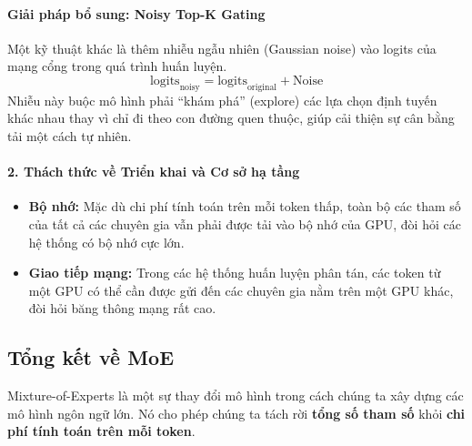 \begin{center}
\label{fig:deepseek_v3_architecture}
\end{center}

\paragraph{Giải pháp bổ sung: Noisy Top-K Gating}
Một kỹ thuật khác là thêm nhiễu ngẫu nhiên (Gaussian noise) vào logits của mạng cổng trong quá trình huấn luyện.
$$ \text{logits}_{\text{noisy}} = \text{logits}_{\text{original}} + \text{Noise} $$
Nhiễu này buộc mô hình phải “khám phá” (explore) các lựa chọn định tuyến khác nhau thay vì chỉ đi theo con đường quen thuộc, giúp cải thiện sự cân bằng tải một cách tự nhiên.

\paragraph{2. Thách thức về Triển khai và Cơ sở hạ tầng}
\begin{itemize}
    \item \textbf{Bộ nhớ:} Mặc dù chi phí tính toán trên mỗi token thấp, toàn bộ các tham số của tất cả các chuyên gia vẫn phải được tải vào bộ nhớ của GPU, đòi hỏi các hệ thống có bộ nhớ cực lớn.
    \item \textbf{Giao tiếp mạng:} Trong các hệ thống huấn luyện phân tán, các token từ một GPU có thể cần được gửi đến các chuyên gia nằm trên một GPU khác, đòi hỏi băng thông mạng rất cao.
\end{itemize}

\subsection{Tổng kết về MoE}
Mixture-of-Experts là một sự thay đổi mô hình trong cách chúng ta xây dựng các mô hình ngôn ngữ lớn. Nó cho phép chúng ta tách rời \textbf{tổng số tham số} khỏi \textbf{chi phí tính toán trên mỗi token}.

